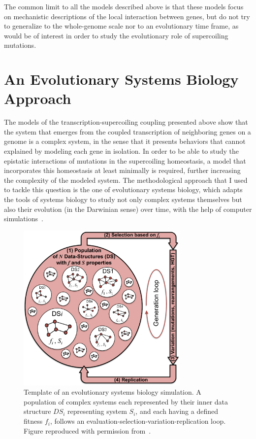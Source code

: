 The common limit to all the models described above is that these models focus on mechanistic descriptions of the local interaction between genes, but do not try to generalize to the whole-genome scale nor to an evolutionary time frame, as would be of interest in order to study the evolutionary role of supercoiling mutations.


\section{An Evolutionary Systems Biology Approach}

The models of the transcription-supercoiling coupling presented above show that the system that emerges from the coupled transcription of neighboring genes on a genome is a complex system, in the sense that it presents behaviors that cannot explained by modeling each gene in isolation.
In order to be able to study the epistatic interactions of mutations in the supercoiling homeostasis, a model that incorporates this homeostasis at least minimally is required, further increasing the complexity of the modeled system.
The methodological approach that I used to tackle this question is the one of evolutionary systems biology, which adapts the tools of systems biology to study not only complex systems themselves but also their evolution (in the Darwinian sense) over time, with the help of computer simulations~\citep{beslon2021}.

\begin{figure}
\centering
\includegraphics[width=0.75\textwidth]{background/img/evol_sys_bio.pdf}
\caption[Template of an evolutionary systems biology simulation]{Template of an evolutionary systems biology simulation.
A population of complex systems each represented by their inner data structure $DS_i$ representing system $S_i$, and each having a defined fitness $f_i$, follows an evaluation-selection-variation-replication loop.
Figure reproduced with permission from~\citep{beslon2021}.}
\label{fig:background:evol-sys-bio}
\end{figure}

